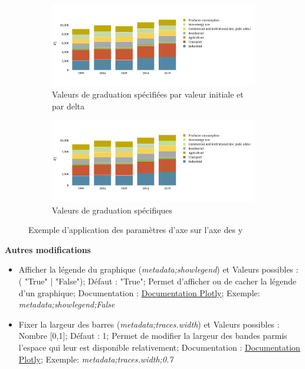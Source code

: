 \documentclass[11pt]{article}
\begin{document}
\begin{figure}[h]
    \centering
    \begin{subfigure}{\textwidth}
      \centering
      \includegraphics[width=\linewidth]{assets/fig3.2_linear_tickmode.png}
      \caption{Valeurs de graduation spécifiées par valeur initiale et par delta}
      \label{fig:grad1}
    \end{subfigure}%
    
    \begin{subfigure}{\textwidth}
      \centering
      \includegraphics[width=\linewidth]{assets/fig3.2_linear_tickvals.png}
      \caption{Valeurs de graduation spécifiques}
      \label{fig:grad2}
    \end{subfigure}
    \caption{Exemple d'application des paramètres d'axe sur l'axe des y}
    \label{fig:exempleGraduation}
    \end{figure}
    
\newpage

    \textbf{Autres modifications}
\begin{itemize}
    \item Afficher la légende du graphique (\textit{metadata;showlegend}) et Valeurs possibles : ( "True" | "False"); Défaut : "True"; Permet d'afficher ou de cacher la légende d'un graphique; Documentation : \href{https://plotly.com/python/reference/#scatter-showlegend}{Documentation Plotly}; Exemple: \textit{metadata;showlegend;False}
    \item Fixer la largeur des barres (\textit{metadata;traces.width}) et Valeurs possibles : Nombre [0,1]; Défaut : 1; Permet de modifier la largeur des bandes parmis l'espace qui leur est disponible relativement; Documentation : \href{update_traceswidth}{Documentation Plotly}; Exemple: \textit{metadata;traces.width;0.7}
\end{itemize}
\end{document}
